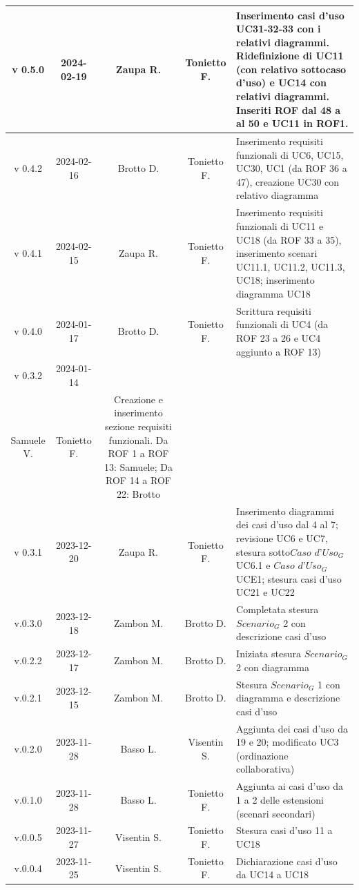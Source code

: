 \documentclass[12pt, oneside]{article}
\begin{document}
\begin{longtable}{|c|c|c|c|p{7cm}|}
\hline
v 0.5.0 & 2024-02-19 & Zaupa R. & Tonietto F. & Inserimento casi d'uso UC31-32-33 con i relativi diagrammi. Ridefinizione di UC11 (con relativo sottocaso d'uso) e UC14 con relativi diagrammi. Inseriti ROF dal 48 a al 50 e UC11 in ROF1. \\
\hline
v 0.4.2 & 2024-02-16 & Brotto D. & Tonietto F. & Inserimento requisiti funzionali di UC6, UC15, UC30, UC1 (da ROF 36 a 47), creazione UC30 con relativo diagramma \\
\hline
v 0.4.1 & 2024-02-15 & Zaupa R. & Tonietto F. & Inserimento requisiti funzionali di UC11 e UC18 (da ROF 33 a 35), inserimento scenari UC11.1, UC11.2, UC11.3, UC18; inserimento diagramma UC18 \\
\hline
v 0.4.0 & 2024-01-17 & Brotto D. & Tonietto F. & Scrittura requisiti funzionali di UC4 (da ROF 23 a 26 e UC4 aggiunto a ROF 13) \\
\hline
v 0.3.2 & 2024-01-14 & 
\begin{tabular}[c]{@{}c@{}}
    Davide B. \\
    Samuele V.
  \end{tabular} 
& Tonietto F. & Creazione e inserimento sezione requisiti funzionali. Da ROF 1 a ROF 13: Samuele; Da ROF 14 a ROF 22: Brotto\\
\hline
v 0.3.1 & 2023-12-20 & Zaupa R. & Tonietto F. & Inserimento diagrammi dei casi d'uso dal 4 al 7; revisione  UC6 e UC7, stesura sotto$\textit{Caso d'Uso}_G$ UC6.1 e $\textit{Caso d'Uso}_G$ UCE1; stesura casi d'uso UC21 e UC22 \\
\hline
v.0.3.0 & 2023-12-18 & Zambon M. & Brotto D. & Completata stesura $\textit{Scenario}_G$ 2 con descrizione casi d'uso \\
\hline
v.0.2.2 & 2023-12-17 & Zambon M. & Brotto D. & Iniziata stesura $\textit{Scenario}_G$ 2 con diagramma \\
\hline
v.0.2.1 & 2023-12-15 & Zambon M. & Brotto D. & Stesura $\textit{Scenario}_G$ 1 con diagramma e descrizione casi d'uso \\
\hline
v.0.2.0 & 2023-11-28 & Basso L. & Visentin S. & Aggiunta dei casi d'uso da 19 e 20; modificato UC3 (ordinazione collaborativa) \\
\hline
v.0.1.0 & 2023-11-28 & Basso L. & Tonietto F. & Aggiunta ai casi d'uso da 1 a 2 delle estensioni (scenari secondari) \\
\hline
v.0.0.5 & 2023-11-27 & Visentin S. & Tonietto F. & Stesura casi d'uso 11 a UC18 \\
\hline
v.0.0.4 & 2023-11-25 & Visentin S. & Tonietto F. & Dichiarazione casi d'uso da UC14 a UC18 \\

\end{longtable}
\end{document}
